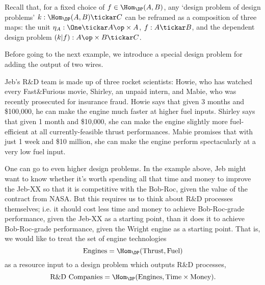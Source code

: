 Recall that, for a fixed choice of $f \in \Hom_\DP(A,B)$, any `design problem of design problems' $k : \Hom_\DP(A,B) \tickar C$ can be reframed as a composition of three maps: the unit $\eta_A : \One \tickar A\op \times A$, $f : A \tickar B$, and the dependent design problem $(k | f) : A\op \times B \tickar C$.


Before going to the next example, we introduce a special design problem for adding the output of two wires.


\begin{example}
Jeb's R\&D team is made up of three rocket scientists: Howie, who has watched every Fast\&Furious movie, Shirley, an unpaid intern, and Mabie, who was recently prosecuted for insurance fraud. Howie says that given 3 months and \$100,000, he can make the engine much faster at higher fuel inputs. Shirley says that given 1 month and \$10,000, she can make the engine slightly more fuel-efficient at all currently-feasible thrust performances. Mabie promises that with just 1 week and \$10 million, she can make the engine perform spectacularly at a very low fuel input.
\end{example}

One can go to even higher design problems. In the example above, Jeb might want to know whether it's worth spending all that time and money to improve the Jeb-XX so that it is competitive with the Bob-Roc, given the value of the contract from NASA. But this requires us to think about R\&D processes themselves; i.e. it should cost less time and money to achieve Bob-Roc-grade performance, given the Jeb-XX as a starting point, than it does it to achieve Bob-Roc-grade performance, given the Wright engine as a starting point. That is, we would like to treat the set of engine technologies
\[\text{Engines} = \Hom_\DP(\text{Thrust}, \text{Fuel})\]
as a resource input to a design problem which outputs R\&D processes,
\[\text{R\&D Companies} = \Hom_\DP(\text{Engines}, \text{Time} \times \text{Money}).\]

